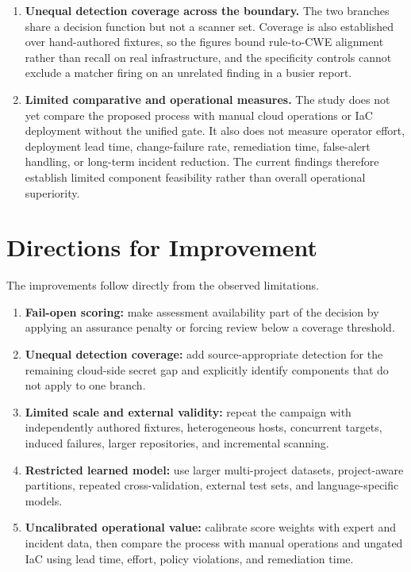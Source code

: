 \begin{enumerate}
    \item \textbf{Unequal detection coverage across the boundary.} The two
    branches share a decision function but not a scanner set. Coverage is also established over hand-authored
    fixtures, so the figures bound rule-to-CWE alignment rather than recall on
    real infrastructure, and the specificity controls cannot exclude a matcher
    firing on an unrelated finding in a busier report.

    \item \textbf{Limited comparative and operational measures.} The study does not yet
    compare the proposed process with manual cloud operations or IaC deployment without
    the unified gate. It also does not measure operator effort, deployment lead time,
    change-failure rate, remediation time, false-alert handling, or long-term incident
    reduction. The current findings therefore establish limited component feasibility
    rather than overall operational superiority.
\end{enumerate}

\section{Directions for Improvement}
\label{sec:discussion-improvements}

The improvements follow directly from the observed limitations.

\begin{enumerate}
    \item \textbf{Fail-open scoring:} make assessment availability part of the decision
    by applying an assurance penalty or forcing review below a coverage threshold.

    \item \textbf{Unequal detection coverage:} add source-appropriate detection for the
    remaining cloud-side secret gap and explicitly identify components that do not apply
    to one branch.

    \item \textbf{Limited scale and external validity:} repeat the campaign with
    independently authored fixtures, heterogeneous hosts, concurrent targets, induced
    failures, larger repositories, and incremental scanning.

    \item \textbf{Restricted learned model:} use larger multi-project datasets,
    project-aware partitions, repeated cross-validation, external test sets, and
    language-specific models.

    \item \textbf{Uncalibrated operational value:} calibrate score weights with expert
    and incident data, then compare the process with manual operations and ungated IaC
    using lead time, effort, policy violations, and remediation time.
\end{enumerate}